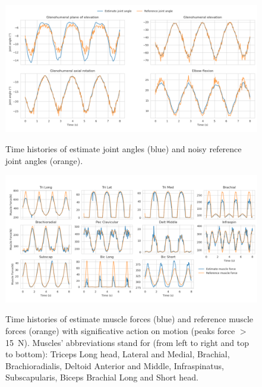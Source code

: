 \begin{figure}[t!] 
\centering 
\includegraphics[width=\textwidth]{figures/joint_angles_MHE.pdf}\\ 
\caption{Time histories of estimate joint angles (blue) and noisy reference joint angles (orange).} 
\label{fig:joint_angles_MHE} 
\end{figure} 

\begin{figure}[t!] 
\centering 
\includegraphics[width=\textwidth]{figures/Muscle_Forces_MHE.pdf}\\ 
\caption{Time histories of estimate muscle forces (blue) and reference muscle forces (orange) with significative action on motion (peaks force $>$ 15~N). 
Muscles' abbreviations stand for (from left to right and top to bottom): Triceps Long head, Lateral and Medial, Brachial, Brachioradialis, Deltoid Anterior and Middle, Infraspinatus, Subscapularis, Biceps Brachial Long and Short head.} 
\label{fig:muscle_forces_MHE} 
\end{figure} 


